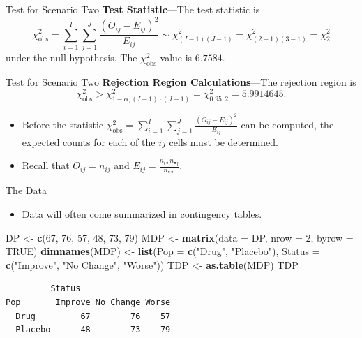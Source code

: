 \documentclass[
  ignorenonframetext,
]{beamer}
\newenvironment{Shaded}{\begin{snugshade}}{\end{snugshade}}
\newcommand{\AttributeTok}[1]{\textcolor[rgb]{0.13,0.29,0.53}{#1}}
\newcommand{\ConstantTok}[1]{\textcolor[rgb]{0.56,0.35,0.01}{#1}}
\newcommand{\DecValTok}[1]{\textcolor[rgb]{0.00,0.00,0.81}{#1}}
\newcommand{\FunctionTok}[1]{\textcolor[rgb]{0.13,0.29,0.53}{\textbf{#1}}}
\newcommand{\NormalTok}[1]{#1}
\newcommand{\OtherTok}[1]{\textcolor[rgb]{0.56,0.35,0.01}{#1}}
\newcommand{\StringTok}[1]{\textcolor[rgb]{0.31,0.60,0.02}{#1}}
\providecommand{\tightlist}{%
  \setlength{\itemsep}{0pt}\setlength{\parskip}{0pt}}
\begin{document}
\begin{frame}{Test for Scenario Two}
\label{test-for-scenario-two-1}
\textbf{Test Statistic}---The test statistic is
\[\chi_{\text{obs}}^2=\sum_{i=1}^I \sum_{j=1}^J 
        \frac{(O_{ij}-E_{ij})^2}{E_{ij}} \sim \chi^2_{(I-1)(J-1)}=
        \chi^2_{(2-1)(3-1)}=\chi^2_2\] under the null hypothesis. The
\(\chi^2_{\text{obs}}\) value is \(6.7584\).
\end{frame}

\begin{frame}{Test for Scenario Two}
\label{test-for-scenario-two-2}
\textbf{Rejection Region Calculations}---The rejection region is
\[\chi_{\text{obs}}^2 > \chi^2_{1-\alpha; (I-1)\cdot(J-1)} = \chi^2_{0.95;2}=5.9914645.\]

\begin{itemize}
\item
  Before the statistic
  \(\chi^2_{\text{obs}}= \sum_{i=1}^I\sum_{j=1}^J \frac{(O_{ij} - E_{ij})^2}{E_{ij}}\)
  can be computed, the expected counts for each of the \(ij\) cells must
  be determined.
\item
  Recall that \(O_{ij}=n_{ij}\) and
  \(E_{ij}=\frac{n_{i\bullet}n_{\bullet j}}{n_{\bullet\bullet}}.\)
\end{itemize}
\end{frame}

\begin{frame}[fragile]{The Data}
\label{the-data}
\begin{itemize}
\tightlist
\item
  Data will often come summarized in contingency tables.
\end{itemize}

\begin{Shaded}
\begin{Highlighting}[]
\NormalTok{DP }\OtherTok{\textless{}{-}} \FunctionTok{c}\NormalTok{(}\DecValTok{67}\NormalTok{, }\DecValTok{76}\NormalTok{, }\DecValTok{57}\NormalTok{, }\DecValTok{48}\NormalTok{, }\DecValTok{73}\NormalTok{, }\DecValTok{79}\NormalTok{)}
\NormalTok{MDP }\OtherTok{\textless{}{-}} \FunctionTok{matrix}\NormalTok{(}\AttributeTok{data =}\NormalTok{ DP, }\AttributeTok{nrow =} \DecValTok{2}\NormalTok{, }\AttributeTok{byrow =} \ConstantTok{TRUE}\NormalTok{)}
\FunctionTok{dimnames}\NormalTok{(MDP) }\OtherTok{\textless{}{-}} \FunctionTok{list}\NormalTok{(}\AttributeTok{Pop =} \FunctionTok{c}\NormalTok{(}\StringTok{"Drug"}\NormalTok{, }\StringTok{"Placebo"}\NormalTok{), }
    \AttributeTok{Status =} \FunctionTok{c}\NormalTok{(}\StringTok{"Improve"}\NormalTok{, }\StringTok{"No Change"}\NormalTok{, }\StringTok{"Worse"}\NormalTok{))}
\NormalTok{TDP }\OtherTok{\textless{}{-}} \FunctionTok{as.table}\NormalTok{(MDP)}
\NormalTok{TDP}
\end{Highlighting}
\end{Shaded}

\begin{verbatim}
         Status
Pop       Improve No Change Worse
  Drug         67        76    57
  Placebo      48        73    79
\end{verbatim}
\end{frame}
\end{document}
